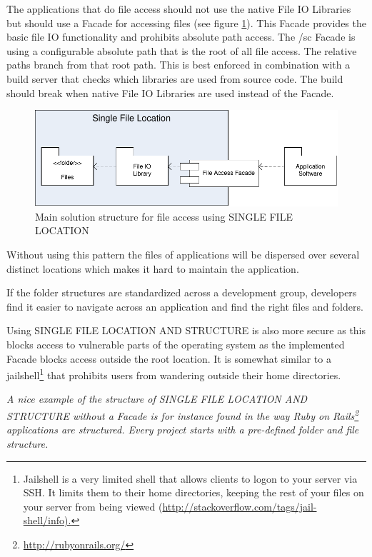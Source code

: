 The applications that do file access should not use the native File IO Libraries but should use a {\sc Facade} \cite{Gamma95} for accessing files (see figure \ref{fig:singleFileLocationDiagram-02}). This {\sc Facade} provides the basic file IO functionality and prohibits absolute path access. The {/sc Facade} is using a configurable absolute path that is the root of all file access. The relative paths branch from that root path.  This is best enforced in combination with a build server that checks which libraries are used from source code. The build should break when native File IO Libraries are used instead of the {\sc Facade}.

\begin{figure}[h!]
\centering
\includegraphics{patterns/singleFileLocationDiagram-02.pdf}
\caption{Main solution structure for file access using SINGLE FILE LOCATION}
\label{fig:singleFileLocationDiagram-02}
\end{figure}

Without using this pattern the files of applications will be dispersed over several distinct locations which makes it hard to maintain the application. 

If the folder structures are standardized across a development group, developers find it easier to navigate across an application and find the right files and folders.

Using SINGLE FILE LOCATION AND STRUCTURE is also more secure as this blocks access to vulnerable parts of the operating system as the implemented {\sc Facade} blocks access outside the root location. It is somewhat similar to a jailshell\footnote{Jailshell is a very limited shell that allows clients to logon to your server via SSH. It limits them to their home directories, keeping the rest of your files on your server from being viewed (\url{http://stackoverflow.com/tags/jail-shell/info).}} that prohibits users from wandering outside their home directories.

\textit{A nice example of the structure of SINGLE FILE LOCATION AND STRUCTURE without a {\sc Facade} is for instance found in the way Ruby on Rails\footnote{\url{http://rubyonrails.org/}} applications are structured. Every project starts with a pre-defined folder and file structure.}
 





